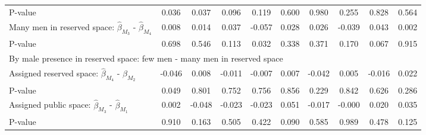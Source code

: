\begin{tabular}{l*{9}{c}}
\quad P-value       &       0.036         &       0.037         &       0.096         &       0.119         &       0.600         &       0.980         &       0.255         &       0.828         &       0.564         \\
\quad Many men in reserved space: $\hat\beta_{M_3}$ - $\hat\beta_{M_4}$&       0.008         &       0.014         &       0.037         &      -0.057         &       0.028         &       0.026         &      -0.039         &       0.043         &       0.002         \\
\quad P-value       &       0.698         &       0.546         &       0.113         &       0.032         &       0.338         &       0.371         &       0.170         &       0.067         &       0.915         \\
\multicolumn{10}{l}{By male presence in reserved space: few men - many men in reserved space} \\ \quad Assigned reserved space: $\hat\beta_{M_4}$ - $\hat\beta_{M_2}$&      -0.046         &       0.008         &      -0.011         &      -0.007         &       0.007         &      -0.042         &       0.005         &      -0.016         &       0.022         \\
\quad P-value       &       0.049         &       0.801         &       0.752         &       0.756         &       0.856         &       0.229         &       0.842         &       0.626         &       0.286         \\
\quad Assigned public space: $\hat\beta_{M_3}$ - $\hat\beta_{M_1}$&       0.002         &      -0.048         &      -0.023         &      -0.023         &       0.051         &      -0.017         &      -0.000         &       0.020         &       0.035         \\
\quad P-value       &       0.910         &       0.163         &       0.505         &       0.422         &       0.090         &       0.585         &       0.989         &       0.478         &       0.125         \\
\hline\hline \end{tabular}
